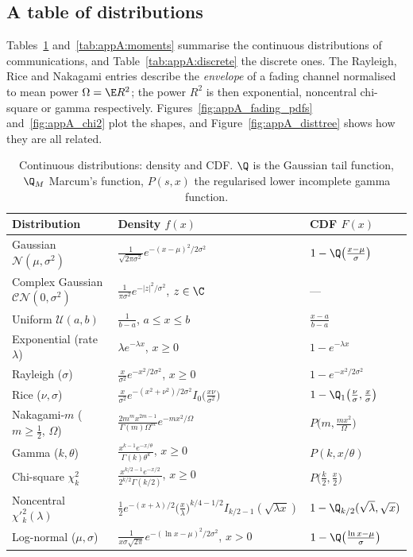 \subsection{A table of distributions}

Tables~\ref{tab:appA:dists} and~\ref{tab:appA:moments} summarise the continuous distributions of
communications, and Table~\ref{tab:appA:discrete} the discrete ones. The Rayleigh, Rice and
Nakagami entries describe the \emph{envelope} of a fading channel normalised to mean power
$\Omega=\E R^2$; the power $R^2$ is then exponential, noncentral chi-square or gamma
respectively. Figures~\ref{fig:appA_fading_pdfs} and~\ref{fig:appA_chi2} plot the shapes, and
Figure~\ref{fig:appA_disttree} shows how they are all related.

\begin{table}[htbp]\centering\footnotesize
\caption{Continuous distributions: density and CDF. $\Q$ is the Gaussian tail function,
$\Q_M$ Marcum's function, $P(s,x)$ the regularised lower incomplete gamma function.}\label{tab:appA:dists}
\renewcommand{\arraystretch}{1.55}
\begin{tabular}{@{}lll@{}}
\toprule
Distribution & Density $f(x)$ & CDF $F(x)$\\
\midrule
Gaussian $\mathcal N(\mu,\sigma^2)$ & $\frac{1}{\sqrt{2\pi\sigma^2}}e^{-(x-\mu)^2/2\sigma^2}$ & $1-\Q\big(\frac{x-\mu}{\sigma}\big)$\\
Complex Gaussian $\mathcal{CN}(0,\sigma^2)$ & $\frac{1}{\pi\sigma^2}e^{-|z|^2/\sigma^2}$, $z\in\C$ & ---\\
Uniform $\mathcal U(a,b)$ & $\frac1{b-a}$, $a\le x\le b$ & $\frac{x-a}{b-a}$\\
Exponential (rate $\lambda$) & $\lambda e^{-\lambda x}$, $x\ge0$ & $1-e^{-\lambda x}$\\
Rayleigh ($\sigma$) & $\frac{x}{\sigma^2}e^{-x^2/2\sigma^2}$, $x\ge0$ & $1-e^{-x^2/2\sigma^2}$\\
Rice ($\nu,\sigma$) & $\frac{x}{\sigma^2}e^{-(x^2+\nu^2)/2\sigma^2}I_0\big(\frac{x\nu}{\sigma^2}\big)$ & $1-\Q_1\big(\frac\nu\sigma,\frac x\sigma\big)$\\
Nakagami-$m$ ($m\ge\frac12$, $\Omega$) & $\frac{2m^m x^{2m-1}}{\Gamma(m)\Omega^m}e^{-mx^2/\Omega}$ & $P\big(m,\frac{mx^2}{\Omega}\big)$\\
Gamma ($k,\theta$) & $\frac{x^{k-1}e^{-x/\theta}}{\Gamma(k)\theta^k}$, $x\ge0$ & $P(k,x/\theta)$\\
Chi-square $\chi^2_k$ & $\frac{x^{k/2-1}e^{-x/2}}{2^{k/2}\Gamma(k/2)}$, $x\ge0$ & $P\big(\frac k2,\frac x2\big)$\\
Noncentral $\chi'^2_k(\lambda)$ & $\frac12e^{-(x+\lambda)/2}\big(\frac x\lambda\big)^{k/4-1/2}I_{k/2-1}(\sqrt{\lambda x})$ & $1-\Q_{k/2}(\sqrt\lambda,\sqrt x)$\\
Log-normal ($\mu,\sigma$) & $\frac{1}{x\sigma\sqrt{2\pi}}e^{-(\ln x-\mu)^2/2\sigma^2}$, $x>0$ & $1-\Q\big(\frac{\ln x-\mu}{\sigma}\big)$\\
\bottomrule
\end{tabular}
\end{table}

